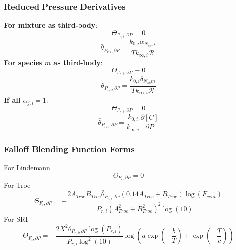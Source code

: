 \documentclass[a4paper,10pt]{article}
\newcommand{\ns}{N_{sp}}
\newcommand{\Ru}{\mathcal{R}}
\begin{document}
\subsubsection{Reduced Pressure Derivatives}
\textbf{For mixture as third-body}:
\begin{dmath} \Theta_{P_{r,i}, \partial P} = 0\end{dmath} 
\begin{dmath} \bar{\theta}_{P_{r, i}, \partial P} = \frac{k_{0, i} \alpha_{\ns,i}}{T k_{\infty, i} \Ru}\end{dmath} 
\textbf{For species $m$ as third-body}:
\begin{dmath} \Theta_{P_{r,i}, \partial P} = 0\end{dmath} 
\begin{dmath} \bar{\theta}_{P_{r, i}, \partial P} = \frac{k_{0, i} \delta_{\ns m}}{T k_{\infty, i} \Ru}\end{dmath} 
\textbf{If all $\alpha_{j,i} = 1$}:
\begin{dmath} \Theta_{P_{r,i}, \partial P} = 0\end{dmath} 
\begin{dmath} \bar{\theta}_{P_{r, i}, \partial P} = \frac{k_{0, i}}{k_{\infty, i}} \frac{\partial [C] }{\partial P }\end{dmath} 
\subsubsection{Falloff Blending Function Forms}
For Lindemann
\begin{dmath} \Theta_{F_i, \partial P} = 0\end{dmath} 
For Troe
\begin{dmath} \Theta_{F_i, \partial P} = - \frac{2 A_{Troe} B_{Troe} \bar{\theta}_{P_{r, i}, \partial P} \left(0.14 A_{Troe} + B_{Troe}\right) \log{\left (F_{cent} \right )}}{P_{r, i} \left(A_{Troe}^{2} + B_{Troe}^{2}\right)^{2} \log{\left (10 \right )}}\end{dmath} 
For SRI
\begin{dmath} \Theta_{F_i, \partial P} = - \frac{2 X^{2} \bar{\theta}_{P_{r, i}, \partial P} \log{\left (P_{r, i} \right )}}{P_{r, i} \log^{2}{\left (10 \right )}} \log{\left (a \operatorname{exp}\left({- \frac{b}{T}}\right) + \operatorname{exp}\left({- \frac{T}{c}}\right) \right )}\end{dmath} 
\end{document}
